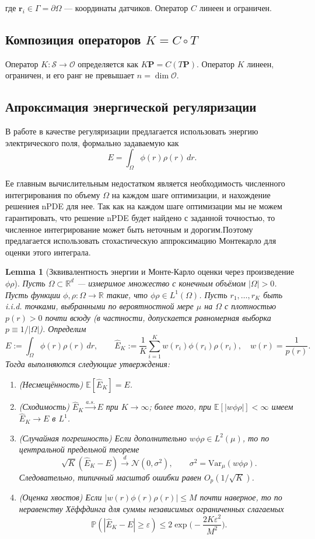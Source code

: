 \documentclass[sn-mathphys-num]{bst/sn-jnl}
\theoremstyle{thmstylethree}
\theoremstyle{thmstyletwo}
\theoremstyle{thmstyleone}
\newtheorem{lemma}{Lemma}
\begin{document}
где $\mathbf{r}_i \in \Gamma = \partial\Omega$ --- координаты датчиков. Оператор $C$ линеен и ограничен.

\subsection{Композиция операторов $K = C \circ T$}
Оператор $K: \mathcal{S} \to \mathcal{O}$ определяется как $K\mathbf{P} = C(T\mathbf{P})$. Оператор $K$ линеен, ограничен, и его ранг не превышает $n = \dim \mathcal{O}$.

\subsection{Апроксимация энергической регуляризации}
\label{subsec:regularization}
В работе в качестве регуляризации предлагается использовать энергию электрического поля, формально задаваемую как
\[ E = \int_{\Omega} \phi(r)\rho(r)\,dr. \]

Ее главным вычислительным недостатком является необходимость численного интегрирования по объему $\Omega$ на каждом шаге оптимизации,
и нахождение решениея nPDE для нее. Так как на каждом шаге оптимизации мы не можем гарантировать, что решение nPDE будет найдено 
с заданной точностью, то численное интегрирование может быть неточным и дорогим.Поэтому предлагается использовать стохастическую
аппроксимацию Монтекарло для оценки этого интеграла.

\begin{lemma}[Зквивалентность  энергии и Монте-Карло оценки через произведение $\phi\rho$]
Пусть $\Omega\subset\mathbb{R}^d$ — измеримое множество с конечным объёмом $|\Omega|>0$. Пусть функции $\phi,\rho:\Omega\to\mathbb{R}$ такие, что $\phi\rho\in L^1(\Omega)$. Пусть $r_1,\dots,r_K$ быть i.i.d. точками, выбранными по вероятностной мере $\mu$ на $\Omega$ с плотностью $p(r)>0$ почти всюду (в частности, допускается равномерная выборка $p\equiv1/|\Omega|$). Определим
\[ E:=\int_{\Omega}\phi(r)\rho(r)\,dr,\qquad \hat E_K:=\frac{1}{K}\sum_{i=1}^K w(r_i)\phi(r_i)\rho(r_i),\quad w(r)=\frac{1}{p(r)}.\]
Тогда выполняются следующие утверждения:
\begin{enumerate}
\item (Несмещённость) $\mathbb{E}[\hat E_K]=E$.
\item (Сходимость) $\hat E_K\xrightarrow{a.s.}E$ при $K\to\infty$; более того, при $\mathbb{E}[|w\phi\rho|]<\infty$ имеем $\hat E_K\to E$ в $L^1$.
\item (Случайная погрешность) Если дополнительно $w\phi\rho\in L^2(\mu)$, то по центральной предельной теореме
\[ \sqrt{K}(\hat E_K-E)\xrightarrow{d}\mathcal{N}(0,\sigma^2),\qquad \sigma^2=\mathrm{Var}_\mu(w\phi\rho). \]
Следовательно, типичный масштаб ошибки равен $O_p(1/\sqrt{K})$.
\item (Оценка хвостов) Если $|w(r)\phi(r)\rho(r)|\le M$ почти наверное, то по неравенству Хёффдинга для суммы независимых ограниченных слагаемых
\[ \mathbb{P}(|\hat E_K-E|\ge\varepsilon)\le 2\exp\Big(-\frac{2K\varepsilon^2}{M^2}\Big). \]
\end{enumerate}
\end{lemma}
\end{document}
